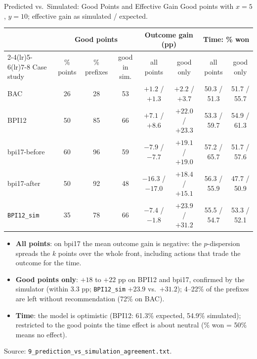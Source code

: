 \documentclass[aspectratio=169]{beamer} %
\begin{document}
\begin{frame}{Predicted vs.\ Simulated: Good Points and Effective Gain}
  \footnotesize
  Good points with $x = 5$, $y = 10$; effective gain as simulated / expected.
  \begin{center}\scriptsize\setlength{\tabcolsep}{2.5pt}
  \begin{tabular}{l ccc cc cc}
    \toprule
     & \multicolumn{3}{c}{Good points} & \multicolumn{2}{c}{Outcome gain (pp)} & \multicolumn{2}{c}{Time: \% won} \\
    \cmidrule(lr){2-4}\cmidrule(lr){5-6}\cmidrule(lr){7-8}
    Case study & \% points & \% prefixes & good in sim. & all points & good only & all points & good only \\
    \midrule
    BAC                 & 26 & 28 & 53 & $+1.2$ / $+1.3$   & $+2.2$ / $+3.7$   & 50.3 / 51.3 & 51.7 / 55.7 \\
    BPI12               & 50 & 85 & 66 & $+7.1$ / $+8.6$   & $+22.0$ / $+23.3$ & 53.3 / 59.7 & 54.9 / 61.3 \\
    bpi17-before        & 60 & 96 & 59 & $-7.9$ / $-7.7$   & $+19.1$ / $+19.0$ & 57.2 / 65.7 & 51.7 / 57.6 \\
    bpi17-after         & 50 & 92 & 48 & $-16.3$ / $-17.0$ & $+18.4$ / $+15.1$ & 56.3 / 55.9 & 47.7 / 50.9 \\
    \texttt{BPI12\_sim} & 35 & 78 & 66 & $-7.4$ / $-1.8$   & $+23.9$ / $+31.2$ & 55.5 / 54.7 & 53.3 / 52.1 \\
    \bottomrule
  \end{tabular}
  \end{center}
  \scriptsize
  \begin{itemize}
    \item \textbf{All points}: on bpi17 the mean outcome gain is negative: the $p$-dispersion spreads the $k$
      points over the whole front, including actions that trade the outcome for the time.
    \item \textbf{Good points only}: $+18$ to $+22$ pp on BPI12 and bpi17, confirmed by the simulator (within 3.3 pp;
      \texttt{BPI12\_sim} $+23.9$ vs.\ $+31.2$); 4--22\% of the prefixes are left without recommendation (72\% on BAC).
    \item \textbf{Time}: the model is optimistic (BPI12: 61.3\% expected, 54.9\% simulated); restricted to the good
      points the time effect is about neutral (\% won = 50\% means no effect).
  \end{itemize}
  {\scriptsize Source: \texttt{9\_prediction\_vs\_simulation\_agreement.txt}.}
\end{frame}
\end{document}

